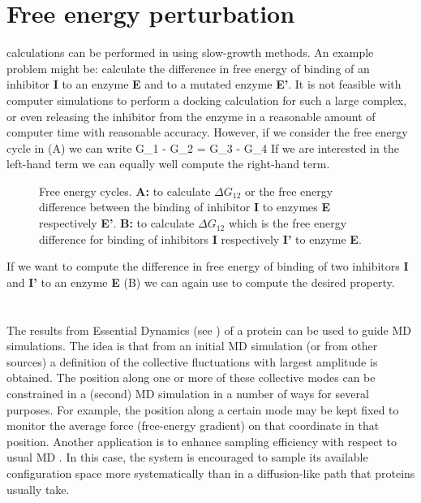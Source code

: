 \section{Free energy perturbation}
\label{sec:fepalg}
 calculations can be performed
in {\gromacs} using slow-growth methods. An example problem might be:
calculate the difference in free energy of binding of an inhibitor {\bf I}
to an enzyme {\bf E} and to a mutated enzyme {\bf E'}.
It is not feasible with computer simulations to perform a docking
calculation for such a large complex, or even releasing the inhibitor from
the enzyme in a reasonable amount of computer time with reasonable accuracy.
However, if we consider the free energy cycle in (A)
we can write
\beq
\Delta G_1 - \Delta G_2 =       \Delta G_3 - \Delta G_4
\label{eqn:ddg}
\eeq
If we are interested in the left-hand term we can equally well compute
the right-hand term.
\begin{figure}
\centerline{\hspace{2cm}}
\caption[Free energy cycles.]{Free energy cycles. {\bf A:} to
calculate $\Delta G_{12}$ or the free energy difference between the
binding of inhibitor {\bf I} to enzymes {\bf E} respectively {\bf
E'}. {\bf B:} to calculate $\Delta G_{12}$ which is the free energy
difference for binding of inhibitors {\bf I} respectively {\bf I'} to
enzyme {\bf E}.}
\label{fig:free}
\end{figure}

If we want to compute the difference in free energy of binding of two
inhibitors {\bf I} and {\bf I'} to an enzyme {\bf E} (B)
we can again use  to compute the desired property.

\section{}
The results from Essential Dynamics (see )
of a protein can be used to guide MD simulations. The idea is that
from an initial MD simulation (or from other sources) a definition of
the collective fluctuations with largest amplitude is obtained. The
position along one or more of these collective modes can be
constrained in a (second) MD simulation in a number of ways for
several purposes. For example, the position along a certain mode may
be kept fixed to monitor the average force (free-energy gradient) on
that coordinate in that position. Another application is to enhance
sampling efficiency with respect to usual MD
\cite{Degroot96a,Degroot96b}. In this case, the system is encouraged
to sample its available configuration space more systematically than
in a diffusion-like path that proteins usually take.

